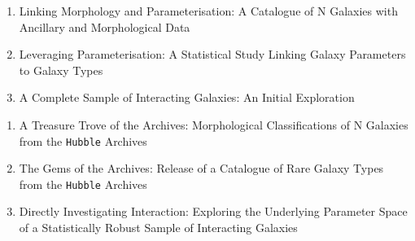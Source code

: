 \documentclass[11pt,usenatbib]{article}
\begin{document}
\begin{enumerate}[itemsep=0pt, parsep=0pt, topsep=0pt]
    \item Linking Morphology and Parameterisation: A Catalogue of N Galaxies with Ancillary and Morphological Data
    \item Leveraging Parameterisation: A Statistical Study Linking Galaxy Parameters to Galaxy Types
    \item A Complete Sample of Interacting Galaxies: An Initial Exploration \\
\end{enumerate}

\begin{enumerate}[itemsep=0pt, parsep=0pt, topsep=0pt]
    \item A Treasure Trove of the Archives: Morphological Classifications of N Galaxies from the \texttt{Hubble} Archives
    \item The Gems of the Archives: Release of a Catalogue of Rare Galaxy Types from the \texttt{Hubble} Archives
    \item Directly Investigating Interaction: Exploring the Underlying Parameter Space of a Statistically Robust Sample of Interacting Galaxies
\end{enumerate}




\end{document}
